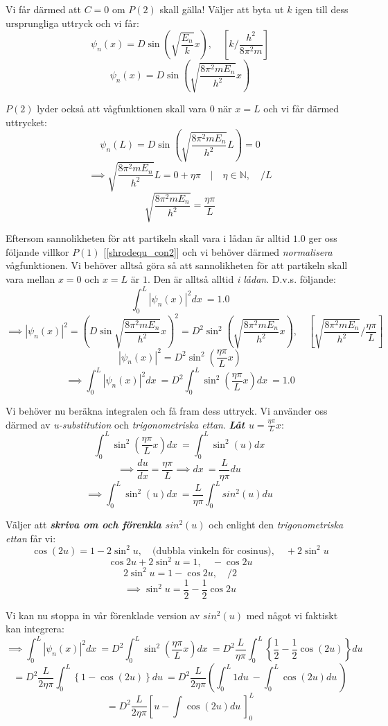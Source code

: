 \documentclass{article}
\newcommand{\shrodprob}{|\psi_n(x)|^2}
\begin{document}
Vi får därmed att $C=0$ om $P(2)$ skall gälla! Väljer att byta ut $k$ igen till dess ursprungliga uttryck och vi får:
$$
\psi_n(x) = D \sin \left(\sqrt{\frac{E_n}{k}} x \right), \quad \left[k/\frac{h^2}{8 \pi ^2 m}\right]
$$
$$
\psi_n(x) = D \sin \left( \sqrt{\frac{8 \pi^2 m E_n}{h^2}} x \right)
$$

$P(2)$ lyder också att vågfunktionen skall vara $0$ när $x=L$ och vi får därmed uttrycket:
$$
\psi_n(L) = D \sin \left( \sqrt{\frac{8 \pi^2 m E_n}{h^2}} L \right) = 0
$$
$$
\implies \sqrt{\frac{8 \pi^2 m E_n}{h^2}} L = 0 + \eta\pi \quad | \quad \eta \in \mathbb{N}, \quad /L
$$
$$
\sqrt{\frac{8 \pi^2 m E_n}{h^2}} = \frac{\eta\pi}{L}
$$

Eftersom sannolikheten för att partikeln skall vara i lådan är alltid $1.0$ ger oss följande villkor $P(1)$ [\ref{shrodequ_con2}] och vi behöver därmed \emph{normalisera} vågfunktionen. Vi behöver alltså göra så att sannolikheten för att partikeln skall vara mellan $x=0$ och $x=L$ är $1$. Den är alltså alltid \emph{i lådan}. D.v.s. följande:
$$
\int_0^L \shrodprob dx\ = 1.0
$$
$$
\implies \shrodprob = \left( D\sin \sqrt{\frac{8 \pi^2 m E_n}{h^2}}x \right)^2
= D^2 \sin^2 \left( \sqrt{\frac{8 \pi^2 m E_n}{h^2}}x \right), \quad \left[ \sqrt{\frac{8 \pi^2 m E_n}{h^2}} / \frac{\eta\pi}{L}
\right]
$$
$$
\shrodprob = D^2 \sin^2 \left( \frac{\eta\pi}{L} x \right)
$$
$$
\implies \int_0^L \shrodprob dx\ = D^2 \int_0^L \sin^2\left( \frac{\eta\pi}{L} x \right) dx\ = 1.0
$$

Vi behöver nu beräkna integralen och få fram dess uttryck. Vi använder oss därmed av \emph{u-substitution} och \emph{trigonometriska ettan}. \emph{\textbf{Låt $u = \frac{\eta\pi}{L}x$}}:
$$
\int_0^L \sin^2\left( \frac{\eta\pi}{L} x \right) dx\ = \int_0^L \sin^2(u) dx\
$$
$$
\implies \frac{du}{dx} = \frac{\eta\pi}{L} \implies dx\ = \frac{L}{\eta\pi} du\
$$
$$
\implies \int_0^L \sin^2(u) dx\ = \frac{L}{\eta\pi} \int_0^L sin^2(u) du\
$$

Väljer att \emph{\textbf{skriva om och förenkla $sin^2\left(u\right)$}} och enlight den \emph{trigonometriska ettan} får vi:
$$
\cos(2u) = 1 - 2\sin^2 u, \quad \text{(dubbla vinkeln för cosinus)}, \quad +2\sin^2 u
$$
$$
\cos 2u + 2\sin^2 u = 1, \quad -\cos 2u
$$
$$
2\sin^2 u = 1 - \cos 2u, \quad /2
$$
$$
\implies \sin^2 u = \frac{1}{2} - \frac{1}{2}\cos 2u
$$

Vi kan nu stoppa in vår förenklade version av $sin^2(u)$ med något vi faktiskt kan integrera:
$$
\implies \int_0^L \shrodprob dx\ 
= D^2 \int_0^L \sin^2\left( \frac{\eta\pi}{L} x \right) dx\ 
= D^2 \frac{L}{\eta\pi} \int_0^L \left\{ \frac{1}{2} - \frac{1}{2}\cos(2u) \right\} du\ 
$$
$$
= D^2 \frac{L}{2\eta\pi} \int_0^L \left\{ 1 - \cos(2u) \right\} du\ 
= D^2 \frac{L}{2\eta\pi} \left( \int_0^L 1 du\ - \int_0^L \cos(2u) du\ \right)
$$
$$
= D^2 \frac{L}{2\eta\pi} \left[u - \int \cos(2u) du\ \right]_0^L
$$
\end{document}
